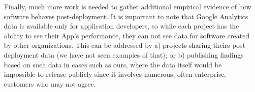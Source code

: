 \documentclass[smallextended]{svjour3}       %
\begin{document}
Finally, much more work is needed to gather additional empirical
evidence of how software behaves post-deployment. It is important to
note that Google Analytics data is available only for application
developers, so while each project has the ability to see their App's
performance, they can not see data for software created by other
organizations. This can be addressed by a) projects sharing theirs
post-deployment data (we have not seen examples of that); or b)
publishing findings based on such data in cases such as ours,
where the data itself would be impossible to release publicly since
it involves numerous, often enterprise, customers who may not agree.





\end{document}
